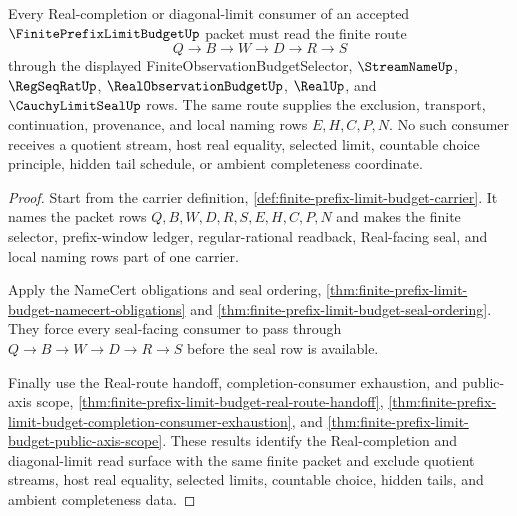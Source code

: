 \begin{theorem}
\label{thm:finite-prefix-limit-budget-real-completion-root-unblock}
Every Real-completion or diagonal-limit consumer of an accepted $\FinitePrefixLimitBudgetUp$ packet must read the finite route
$$
Q \to B \to W \to D \to R \to S
$$
through the displayed FiniteObservationBudgetSelector, $\StreamNameUp$, $\RegSeqRatUp$, $\RealObservationBudgetUp$, $\RealUp$, and $\CauchyLimitSealUp$ rows. The same route supplies the exclusion, transport, continuation, provenance, and local naming rows $E,H,C,P,N$. No such consumer receives a quotient stream, host real equality, selected limit, countable choice principle, hidden tail schedule, or ambient completeness coordinate.
\end{theorem}
\begin{proof}
Start from the carrier definition, \autoref{def:finite-prefix-limit-budget-carrier}. It names the packet rows $Q,B,W,D,R,S,E,H,C,P,N$ and makes the finite selector, prefix-window ledger, regular-rational readback, Real-facing seal, and local naming rows part of one carrier.

Apply the NameCert obligations and seal ordering, \autoref{thm:finite-prefix-limit-budget-namecert-obligations} and \autoref{thm:finite-prefix-limit-budget-seal-ordering}. They force every seal-facing consumer to pass through $Q \to B \to W \to D \to R \to S$ before the seal row is available.

Finally use the Real-route handoff, completion-consumer exhaustion, and public-axis scope, \autoref{thm:finite-prefix-limit-budget-real-route-handoff}, \autoref{thm:finite-prefix-limit-budget-completion-consumer-exhaustion}, and \autoref{thm:finite-prefix-limit-budget-public-axis-scope}. These results identify the Real-completion and diagonal-limit read surface with the same finite packet and exclude quotient streams, host real equality, selected limits, countable choice, hidden tails, and ambient completeness data.
\end{proof}

